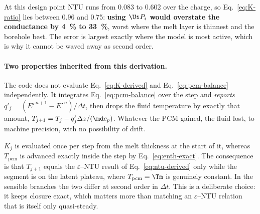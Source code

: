 \noindent
At this design point $\mathrm{NTU}$ runs from \num{0.083} to \num{0.602} over
the charge, so Eq.~\eqref{eq:K-ratio} lies between \num{0.96} and \num{0.75}:
\textbf{using $\Ui P_{i}$ would overstate the conductance by \SI{4}{\percent}
to \SI{33}{\percent}}, worst where the melt layer is thinnest and the borehole
best. The error is largest exactly where the model is most active, which is why
it cannot be waved away as second order.

\paragraph{Two properties inherited from this derivation.}

\begin{description}[leftmargin=1.9em,itemsep=3pt]
\item[Closure is structural.] The code does not evaluate
  Eq.~\eqref{eq:K-derived} and Eq.~\eqref{eq:pcm-balance} independently. It
  integrates Eq.~\eqref{eq:pcm-balance} over the step and \emph{reports}
  $q'_{j}=(E'^{\,n+1}-E'^{\,n})/\Delta t$, then drops the fluid temperature by
  exactly that amount, $T_{j+1}=T_{j}-q'_{j}\Delta z/(\md c_{p})$. Whatever the
  PCM gained, the fluid lost, to machine precision, with no possibility of
  drift.
\item[$K$ is frozen over a time step, $T_{\mathrm{pcm}}$ is not.] $K_{j}$ is
  evaluated once per step from the melt thickness at the start of it, whereas
  $T_{\mathrm{pcm}}$ is advanced exactly inside the step by
  Eq.~\eqref{eq:enth-exact}. The consequence is that $T_{j+1}$ equals the
  $\varepsilon$--NTU result of Eq.~\eqref{eq:ntu-derived} only while the segment
  is on the latent plateau, where $T_{\mathrm{pcm}}=\Tm$ is genuinely constant.
  In the sensible branches the two differ at second order in $\Delta t$. This
  is a deliberate choice: it keeps closure exact, which matters more than
  matching an $\varepsilon$--NTU relation that is itself only quasi-steady.
\end{description}
